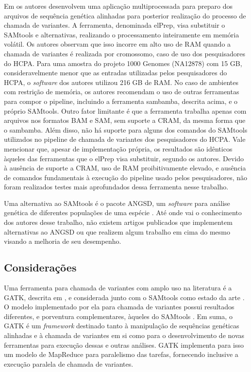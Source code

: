 \documentclass[cic,tc]{iiufrgs}
\begin{document}
Em \cite{herzeel2015elprep} os autores desenvolvem uma aplicação
multiprocessada para preparo dos arquivos de sequência genética alinhadas para
posterior realização do processo de chamada de variantes. A ferramenta,
denominada elPrep, visa substituir o SAMtools e alternativas, realizando o
processamento inteiramente em memória volátil. Os autores observam que isso
incorre em alto uso de RAM quando a chamada de variantes é realizada por
cromossomo, caso de uso dos pesquisadores do HCPA. Para uma amostra do projeto
1000 Genomes (NA12878) com 15 GB, consideravelmente menor que as entradas
utilizadas pelos pesquisadores do HCPA, o \textit{software} dos autores utilizou 216 GB
de RAM. No caso de ambientes com restrição de memória, os autores recomendam o
uso de outras ferramentas para compor o pipeline, incluindo a ferramenta
sambamba, descrita acima, e o próprio SAMtools. Outro fator limitante é que a
ferramenta trabalha apenas com arquivos nos formatos BAM e SAM, sem suporte a
CRAM, da mesma forma que o sambamba. Além disso, não há suporte para alguns dos
comandos do SAMtools utilizados no pipeline de chamada de variantes dos
pesquisadores do HCPA. Vale mencionar que, apesar de implementação própria, os
resultados são idênticos àqueles das ferramentas que o elPrep visa substituir,
segundo os autores. Devido à ausência de suporte a CRAM, uso de RAM
proibitivamente elevado, e ausência de comandos fundamentais à execução do
pipeline usado pelos pesquisadores, não foram realizados testes mais
aprofundados dessa ferramenta nesse trabalho.

Uma alternativa ao SAMtools é o pacote ANGSD, um \textit{software} para análise genética
de diferentes populações de uma espécie \cite{korneliussen2014angsd}. Até onde
vai o conhecimento dos autores desse trabalho, não existem artigos publicados
que implementem alternativas ao ANGSD ou que realizem algum trabalho em cima do
mesmo visando a melhoria de seu desempenho.

\subsection{Considerações}
\label{sec:alt}

Uma ferramenta para chamada de variantes com amplo uso na literatura
\cite{de2017gatk} é a GATK, descrita em \cite{mckenna2010genome}, e considerada
junto com o SAMtools como estado da
arte \cite{yao2020evaluation} \cite{poplin2018universal}. O modelo implementado
por ela para chamada de variantes possui resultados diferentes, e porventura
complementares, àqueles do
SAMtools \cite{gezsi2015variantmetacaller} \cite{hwang2015systematic}. Em suma, o
GATK é um \textit{framework} destinado tanto à manipulação de sequências genéticas
alinhadas e à chamada de variantes em si como para o desenvolvimento de novas
ferramentas para execução dessas e outras análises. GATK implementa para isso
um modelo de MapReduce para paralelismo das tarefas, fornecendo inclusive a
execução paralela de chamada de variantes.
\end{document}
